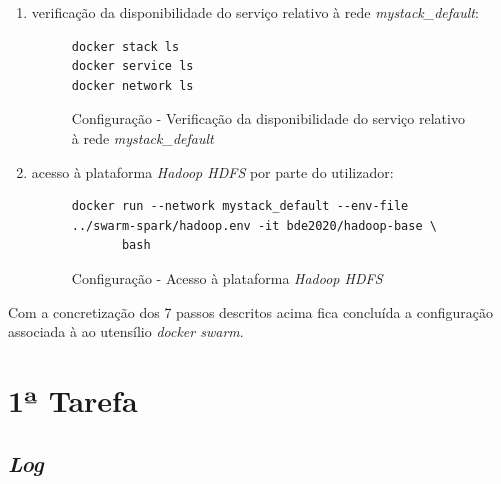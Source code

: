 \documentclass[a4paper]{report}
\begin{document}
{\begin{enumerate}[label=\textbf{\arabic*.}]
            \begin{figure}[H]
                \centering
                \begin{verbatim}
streamgen:
  image: streamgen
  command: hdfs:///data/title.ratings.tsv 120
  env_file:
    - ./hadoop.env
  deploy:
    mode: replicated
    replicas: 1
    placement:
      constraints:
        - "node.role==manager"
                \end{verbatim}
                \caption{Configuração - Ficheiro \textit{"docker-compose.yml"} - \textit{streamgen}}
                \label{fig:10}
            \end{figure}

            \item verificação da disponibilidade do serviço relativo à rede \textit{mystack\_default}:
            \begin{figure}[H]
                \centering
                \begin{verbatim}
docker stack ls
docker service ls
docker network ls
                \end{verbatim}
                \caption{Configuração - Verificação da disponibilidade do serviço relativo à rede \textit{mystack\_default}}
                \label{fig:11}
            \end{figure}

            \item acesso à plataforma \textit{Hadoop HDFS} por parte do utilizador:
            \begin{figure}[H]
                \centering
                \begin{verbatim}
docker run --network mystack_default --env-file ../swarm-spark/hadoop.env -it bde2020/hadoop-base \
       bash
                \end{verbatim}
                \caption{Configuração - Acesso à plataforma \textit{Hadoop HDFS}}
                \label{fig:12}
            \end{figure}
        \end{enumerate}}

        Com a concretização dos 7 passos descritos acima fica concluída a configuração associada à ao utensílio \textit{docker swarm}.

    \section{1ª Tarefa} \label{sec:Task1}

        \subsection{\textit{Log}} \label{subsec:Task1-Log}
\end{document}
